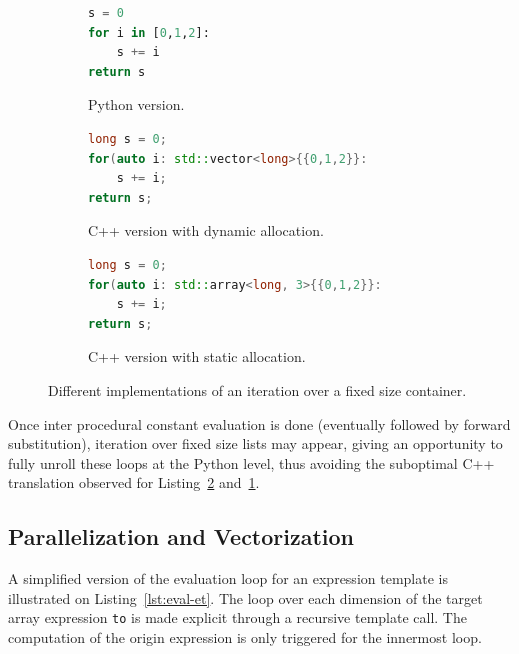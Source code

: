 \documentclass[10pt, preprint]{sigplanconf}
\begin{document}
\begin{figure}

    \begin{subfigure}{.5\textwidth}
    \begin{lstlisting}[language=python]
s = 0
for i in [0,1,2]:
    s += i
return s
\end{lstlisting}
\caption{Python version.}
\end{subfigure}

    \begin{subfigure}{.5\textwidth}
\begin{lstlisting}[language=c++]
long s = 0;
for(auto i: std::vector<long>{{0,1,2}}:
    s += i;
return s;
\end{lstlisting}
\caption{C++ version with dynamic allocation.}
\label{lst:dyna}
\end{subfigure}

    \begin{subfigure}{.5\textwidth}
\begin{lstlisting}[language=c++]
long s = 0;
for(auto i: std::array<long, 3>{{0,1,2}}:
    s += i;
return s;
\end{lstlisting}
\caption{C++ version with static allocation.}
\label{lst:stat}
\end{subfigure}

    \caption{Different implementations of an iteration over a fixed size container.}
    \label{fig:unroll-range}

\end{figure}

Once inter procedural constant evaluation is done (eventually followed by
forward substitution), iteration over fixed size lists may appear, giving an
opportunity to fully unroll these loops at the Python level, thus avoiding the
suboptimal C++ translation observed for Listing~\ref{lst:stat}
and~\ref{lst:dyna}.

\subsection{Parallelization and Vectorization}

A simplified version of the evaluation loop for an expression template is
illustrated on Listing~\ref{lst:eval-et}. The loop over each dimension of the
target array expression \texttt{to} is made explicit through a recursive
template call. The computation of the origin expression is only triggered for
the innermost loop.
\end{document}
